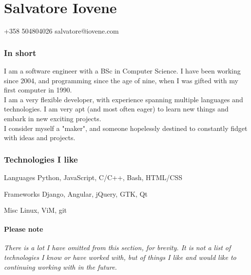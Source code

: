 \documentclass[10pt]{tccv}
\begin{document}
	\part{Salvatore Iovene}
			{+358 504804026}
			{salvatore@iovene.com}


		\section{In short}
			I am a software engineer with a BSc in Computer Science. I have
			been working since 2004, and programming since the age of nine,
			when I was gifted with my first computer in 1990.\\
			
			I am a very flexible developer, with experience spanning multiple
			languages and technologies. I am very apt (and most often eager) to
			learn new things and embark in new exciting projects.\\
			
			I consider myself a "maker", and someone hopelessly destined to
			constantly fidget with ideas and projects.


		\section{Technologies I like}
			\begin{factlist}
				\item{Languages}
					{Python, JavaScript, C/C++, Bash,
					HTML/CSS}

				\item{Frameworks}
					{Django, Angular, jQuery, GTK, Qt}

				\item{Misc}
					{Linux, ViM, git }
			\end{factlist}

			\subsection{Please note}
				\emph{There is a lot I have omitted from this section, for
				brevity. It is not a list of technologies I know or have worked
				with, but of things I like and would like to continuing working
				with in the future.}
\end{document}
